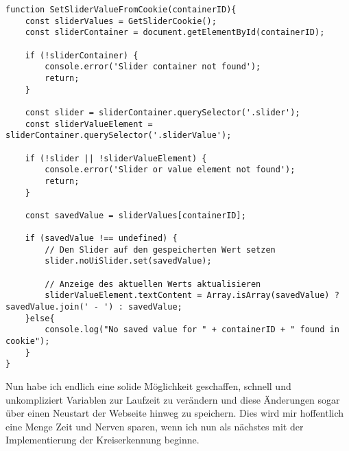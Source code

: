 \begin{lstlisting}[style=JavaScript]
function SetSliderValueFromCookie(containerID){
    const sliderValues = GetSliderCookie();
    const sliderContainer = document.getElementById(containerID);

    if (!sliderContainer) {
        console.error('Slider container not found');
        return;
    }

    const slider = sliderContainer.querySelector('.slider');
    const sliderValueElement = sliderContainer.querySelector('.sliderValue');

    if (!slider || !sliderValueElement) {
        console.error('Slider or value element not found');
        return;
    }

    const savedValue = sliderValues[containerID];

    if (savedValue !== undefined) {
        // Den Slider auf den gespeicherten Wert setzen
        slider.noUiSlider.set(savedValue);

        // Anzeige des aktuellen Werts aktualisieren
        sliderValueElement.textContent = Array.isArray(savedValue) ? savedValue.join(' - ') : savedValue;
    }else{
        console.log("No saved value for " + containerID + " found in cookie");
    }
}
\end{lstlisting}

Nun habe ich endlich eine solide Möglichkeit geschaffen, schnell und unkompliziert Variablen zur Laufzeit zu verändern und diese Änderungen sogar über einen Neustart der Webseite hinweg zu speichern. Dies wird mir hoffentlich eine Menge Zeit und Nerven sparen, wenn ich nun als nächstes mit der Implementierung der Kreiserkennung beginne.